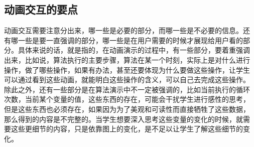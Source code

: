 \subsection{动画交互的要点}
动画交互需要注意分出来，哪一些是必要的部分，而哪一些是不必要的信息。还
有哪一些是要一直强调的部分，哪一些是在用户需要的时候才展现给用户看的部
分。具体来说的话，就是指的，在动画演示的过程中，有一些部分，要着重强调
出来，比如说，算法执行的主要步骤，算法在某一个时刻，实际上是对什么进行
操作，做了哪些操作，如果有办法，甚至还要体现为什么要做这些操作，让学生
可以通过看到这些动画，就能明白这些操作的含义，可以自己去完成这些操作。
除此之外，还有一些部分是在算法演示中不一定被强调的，比如当前执行的循环
次数，当前某个变量的值，这些东西的存在，可能会干扰学生进行感性的思考，
但是这些东西也必须存在，如果因为为了美观和可读性而直接牺牲了这些数据，
那么得到的内容是不完整的。当学生想要深入思考这些变量的变化的时候，就需
要这些更细节的内容，只是依靠图上的变化，是不足以让学生了解这些细节的变
化。
